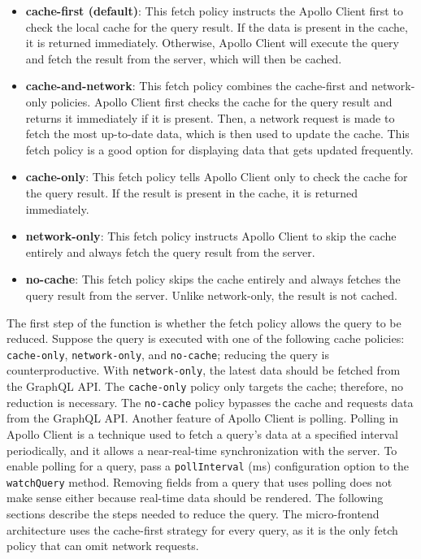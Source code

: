 \begin{itemize}
  \item \textbf{cache-first (default)}: This fetch policy instructs the Apollo Client first to check the local cache for the query result. If the data is present in the cache, it is returned immediately. Otherwise, Apollo Client will execute the query and fetch the result from the server, which will then be cached.
  \item \textbf{cache-and-network}: This fetch policy combines the cache-first and network-only policies. Apollo Client first checks the cache for the query result and returns it immediately if it is present. Then, a network request is made to fetch the most up-to-date data, which is then used to update the cache. This fetch policy is a good option for displaying data that gets updated frequently.
  \item \textbf{cache-only}: This fetch policy tells Apollo Client only to check the cache for the query result. If the result is present in the cache, it is returned immediately.
  \item \textbf{network-only}: This fetch policy instructs Apollo Client to skip the cache entirely and always fetch the query result from the server.
  \item \textbf{no-cache}: This fetch policy skips the cache entirely and always fetches the query result from the server. Unlike network-only, the result is not cached.
\end{itemize}

\noindent The first step of the function is whether the fetch policy allows the query to be reduced. Suppose the query is executed with one of the following cache policies: \texttt{cache-only}, \texttt{network-only}, and \texttt{no-cache}; reducing the query is counterproductive. With \texttt{network-only}, the latest data should be fetched from the GraphQL \ac{API}. The \texttt{cache-only} policy only targets the cache; therefore, no reduction is necessary. The \texttt{no-cache} policy bypasses the cache and requests data from the GraphQL \ac{API}. Another feature of Apollo Client is polling. Polling in Apollo Client is a technique used to fetch a query's data at a specified interval periodically, and it allows a near-real-time synchronization with the server. To enable polling for a query, pass a \texttt{pollInterval} (ms) configuration option to the \texttt{watchQuery} method. Removing fields from a query that uses polling does not make sense either because real-time data should be rendered. The following sections describe the steps needed to reduce the query. The micro-frontend architecture uses the cache-first strategy for every query, as it is the only fetch policy that can omit network requests.

